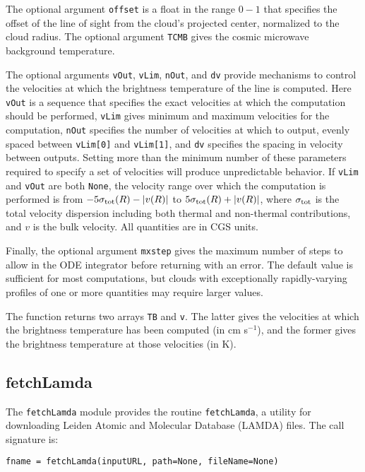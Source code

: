 \documentclass[12pt]{article}
\begin{document}
The optional argument \verb=offset= is a float in the range $0-1$ that specifies the offset of the line of sight from the cloud's projected center, normalized to the cloud radius. The optional argument \verb=TCMB= gives the cosmic microwave background temperature.

The optional arguments \verb=vOut=, \verb=vLim=, \verb=nOut=, and \verb=dv= provide mechanisms to control the velocities at which the brightness temperature of the line is computed. Here \verb=vOut= is a sequence that specifies the exact velocities at which the computation should be performed, \verb=vLim= gives minimum and maximum velocities for the computation, \verb=nOut= specifies the number of velocities at which to output, evenly spaced between \verb=vLim[0]= and \verb=vLim[1]=, and \verb=dv= specifies the spacing in velocity between outputs. Setting more than the minimum number of these parameters required to specify a set of velocities will produce unpredictable behavior. If \verb=vLim= and \verb=vOut= are both \verb=None=, the velocity range over which the computation is performed is from $-5\sigma_{\rm tot}(R) -|v(R)|$ to $5\sigma_{\rm tot}(R)+ |v(R)|$, where $\sigma_{\rm tot}$ is the total velocity dispersion including both thermal and non-thermal contributions, and $v$ is the bulk velocity. All quantities are in CGS units.

Finally, the optional argument \verb=mxstep= gives the maximum number of steps to allow in the ODE integrator before returning with an error. The default value is sufficient for most computations, but clouds with exceptionally rapidly-varying profiles of one or more quantities may require larger values.

The function returns two arrays \verb=TB= and \verb=v=. The latter gives the velocities at which the brightness temperature has been computed (in cm s$^{-1}$), and the former gives the brightness temperature at those velocities (in K).

\clearpage

\subsection{fetchLamda}
\label{sec:fetchlambda}

The \verb=fetchLamda= module provides the routine \verb=fetchLamda=, a utility for downloading Leiden Atomic and Molecular Database (LAMDA) files. The call signature is:

\begin{verbatim}
fname = fetchLamda(inputURL, path=None, fileName=None)
\end{verbatim}
\end{document}
